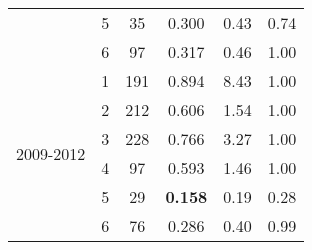 \begin{table}[htbp]
\begin{tabular}{rrcrrr}
    \multicolumn{1}{c}{} & \multicolumn{1}{c}{5} & \multicolumn{1}{c}{35} & \multicolumn{1}{c}{0.300 } & \multicolumn{1}{r}{0.43 } & \multicolumn{1}{c}{0.74 } \\
    \multicolumn{1}{c}{} & \multicolumn{1}{c}{6} & \multicolumn{1}{c}{97} & \multicolumn{1}{c}{0.317} & \multicolumn{1}{r}{0.46 } & \multicolumn{1}{c}{1.00 } \\\midrule
    \multicolumn{1}{c}{\multirow{6}[2]{*}{\begin{sideways}2009-2012\end{sideways}}} & \multicolumn{1}{c}{1} & \multicolumn{1}{c}{191} & \multicolumn{1}{c}{0.894 } & \multicolumn{1}{r}{8.43 } & \multicolumn{1}{c}{1.00 } \\
    \multicolumn{1}{c}{} & \multicolumn{1}{c}{2} & \multicolumn{1}{c}{212} & \multicolumn{1}{c}{0.606 } & \multicolumn{1}{r}{1.54 } & \multicolumn{1}{c}{1.00 } \\
    \multicolumn{1}{c}{} & \multicolumn{1}{c}{3} & \multicolumn{1}{c}{228} & \multicolumn{1}{c}{0.766 } & \multicolumn{1}{r}{3.27 } & \multicolumn{1}{c}{1.00 } \\
    \multicolumn{1}{c}{} & \multicolumn{1}{c}{4} & \multicolumn{1}{c}{97} & \multicolumn{1}{c}{0.593 } & \multicolumn{1}{r}{1.46 } & \multicolumn{1}{c}{1.00 } \\
    \multicolumn{1}{c}{} & \multicolumn{1}{c}{5} & \multicolumn{1}{c}{29} & \multicolumn{1}{c}{\textbf{0.158 }} & \multicolumn{1}{r}{0.19 } & \multicolumn{1}{c}{0.28 } \\
    \multicolumn{1}{c}{} & \multicolumn{1}{c}{6} & \multicolumn{1}{c}{76} & \multicolumn{1}{c}{0.286} & \multicolumn{1}{r}{0.40 } & \multicolumn{1}{c}{0.99 } \\
    \bottomrule
    \end{tabular}%
  \label{tab:pHSWPHPA}%
\end{table}%
